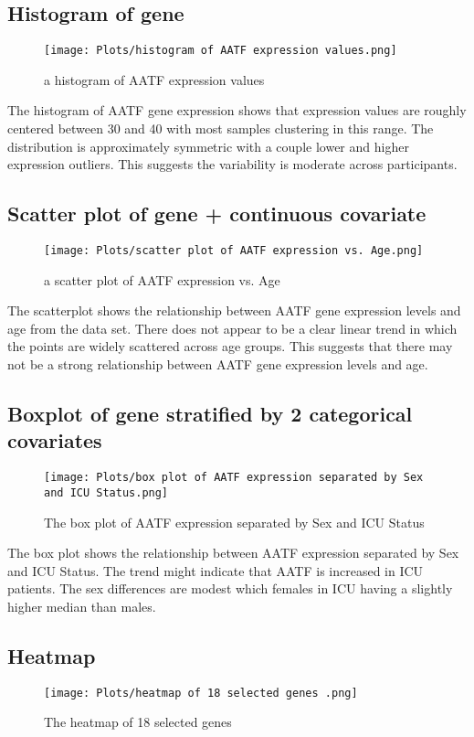 \documentclass{article}
\begin{document}
\subsection{Histogram of gene}
\begin{figure} [H]
    \centering
    \texttt{[image: Plots/histogram of AATF expression values.png]}
    \caption{ a histogram of AATF expression values}
    \label{fig:placeholder}
\end{figure}
The histogram of AATF gene expression shows that expression values are roughly centered between 30 and 40 with most samples clustering in this range. The distribution is approximately symmetric with a couple lower and higher expression outliers. This suggests the variability is moderate across participants.


\subsection{Scatter plot of gene + continuous covariate}
\begin{figure} [H]
    \centering
    \texttt{[image: Plots/scatter plot of AATF expression vs. Age.png]}
    \caption{a scatter plot of AATF expression vs. Age}
    \label{fig:placeholder}
\end{figure}
The scatterplot shows the relationship between AATF gene expression levels and age from the data set. There does not appear to be a clear linear trend in which the points are widely scattered across age groups. This suggests that there may not be a strong relationship between AATF gene expression levels and age.


\subsection{Boxplot of gene stratified by 2 categorical covariates}
\begin{figure}[H]
    \centering
    \texttt{[image: Plots/box plot of AATF expression separated by Sex and ICU Status.png]}
    \caption{The box plot of AATF expression separated by Sex and ICU Status}
    \label{fig:placeholder}
\end{figure}
The box plot shows the relationship between AATF expression separated by Sex and ICU Status. The trend might indicate that AATF is increased in ICU patients. The sex differences are modest which females in ICU having a slightly higher median than males.


\subsection{Heatmap}
\begin{figure}[H]
    \centering
    \texttt{[image: Plots/heatmap of 18 selected genes .png]}
    \caption{The heatmap of 18 selected genes}
    \label{fig:placeholder}
\end{figure}
\end{document}

